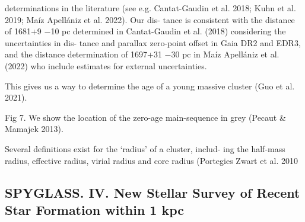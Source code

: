 \documentclass[../Main.tex]{subfiles}
\begin{document}
{determinations in the literature (see e.g. Cantat-Gaudin et al.
2018; Kuhn et al. 2019; Maíz Apellániz et al. 2022). Our dis-
tance is consistent with the distance of 1681+9
−10 pc determined in
Cantat-Gaudin et al. (2018) considering the uncertainties in dis-
tance and parallax zero-point oﬀset in Gaia DR2 and EDR3, and
the distance determination of 1697+31
−30 pc in Maíz Apellániz et al.
(2022) who include estimates for external uncertainties.

This gives us a way to determine the age of a young massive
cluster (Guo et al. 2021).


Fig 7. We show the location of the zero-age main-sequence in grey (Pecaut & Mamajek 2013). 

Several definitions exist for the ‘radius’ of a cluster, includ-
ing the half-mass radius, eﬀective radius, virial radius and core
radius (Portegies Zwart et al. 2010
\subsection{SPYGLASS. IV. New Stellar Survey of Recent Star Formation within 1 kpc}

}
\end{document}

